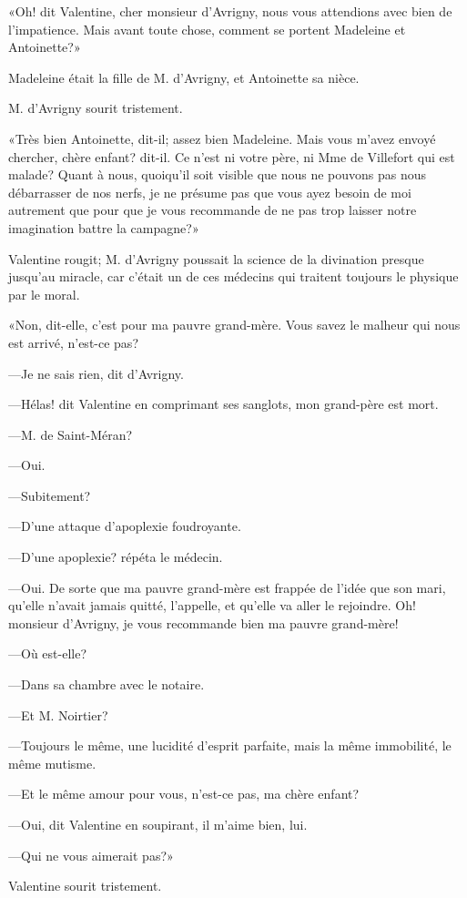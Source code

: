 «Oh! dit Valentine, cher monsieur d'Avrigny, nous vous attendions avec bien de l'impatience. Mais avant toute chose, comment se portent Madeleine et Antoinette?» 

Madeleine était la fille de M. d'Avrigny, et Antoinette sa nièce. 

M. d'Avrigny sourit tristement. 

«Très bien Antoinette, dit-il; assez bien Madeleine. Mais vous m'avez envoyé chercher, chère enfant? dit-il. Ce n'est ni votre père, ni Mme de Villefort qui est malade? Quant à nous, quoiqu'il soit visible que nous ne pouvons pas nous débarrasser de nos nerfs, je ne présume pas que vous ayez besoin de moi autrement que pour que je vous recommande de ne pas trop laisser notre imagination battre la campagne?» 

Valentine rougit; M. d'Avrigny poussait la science de la divination presque jusqu'au miracle, car c'était un de ces médecins qui traitent toujours le physique par le moral. 

«Non, dit-elle, c'est pour ma pauvre grand-mère. Vous savez le malheur qui nous est arrivé, n'est-ce pas? 

—Je ne sais rien, dit d'Avrigny. 

—Hélas! dit Valentine en comprimant ses sanglots, mon grand-père est mort. 

—M. de Saint-Méran? 

—Oui. 

—Subitement? 

—D'une attaque d'apoplexie foudroyante. 

—D'une apoplexie? répéta le médecin. 

—Oui. De sorte que ma pauvre grand-mère est frappée de l'idée que son mari, qu'elle n'avait jamais quitté, l'appelle, et qu'elle va aller le rejoindre. Oh! monsieur d'Avrigny, je vous recommande bien ma pauvre grand-mère! 

—Où est-elle? 

—Dans sa chambre avec le notaire. 

—Et M. Noirtier?  

—Toujours le même, une lucidité d'esprit parfaite, mais la même immobilité, le même mutisme. 

—Et le même amour pour vous, n'est-ce pas, ma chère enfant? 

—Oui, dit Valentine en soupirant, il m'aime bien, lui. 

—Qui ne vous aimerait pas?» 

Valentine sourit tristement. 


